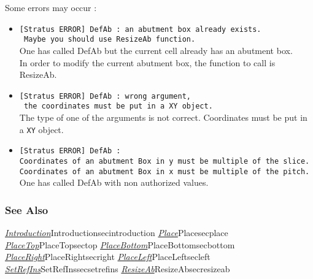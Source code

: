 Some errors may occur :
\begin{itemize}
    \item \verb-[Stratus ERROR] DefAb : an abutment box already exists.-\\\verb- Maybe you should use ResizeAb function.-\\One has called DefAb but the current cell already has an abutment box.\\In order to modify the current abutment box, the function to call is ResizeAb.
    \item \verb-[Stratus ERROR] DefAb : wrong argument,-\\\verb- the coordinates must be put in a XY object.-\\The type of one of the arguments is not correct. Coordinates must be put in a \verb-XY- object.
    \item \verb-[Stratus ERROR] DefAb :-\\\verb-Coordinates of an abutment Box in y must be multiple of the slice.-\\\verb-Coordinates of an abutment Box in x must be multiple of the pitch.-\\One has called DefAb with non authorized values.
\end{itemize}

\begin{htmlonly}

\subsubsection{See Also}

\hyperref[ref]{\emph{Introduction}}{}{Introduction}{secintroduction}
\hyperref[ref]{\emph{Place}}{}{Place}{secplace}
\hyperref[ref]{\emph{PlaceTop}}{}{PlaceTop}{sectop}
\hyperref[ref]{\emph{PlaceBottom}}{}{PlaceBottom}{secbottom}
\hyperref[ref]{\emph{PlaceRight}}{}{PlaceRight}{secright}
\hyperref[ref]{\emph{PlaceLeft}}{}{PlaceLeft}{secleft}
\hyperref[ref]{\emph{SetRefIns}}{}{SetRefIns}{secsetrefins}
\hyperref[ref]{\emph{ResizeAb}}{}{ResizeAb}{secresizeab}

\end{htmlonly}
